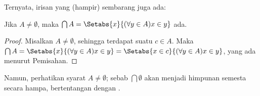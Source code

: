 \documentclass[../../../include/open-logic-section]{subfiles}
\begin{document}
Ternyata, irisan yang (hampir) sembarang juga ada:

\begin{prop}
Jika $A \neq \emptyset$, maka
$\bigcap A = \Setabs{x}{(\forall y \in A)x \in y}$ ada.
\end{prop}

\begin{proof}
Misalkan $A \neq \emptyset$, sehingga terdapat suatu $c \in A$. Maka
$\bigcap A = \Setabs{x}{(\forall y \in A)x \in y} =
\Setabs{x \in c}{(\forall y \in A)x \in y}$, yang ada menurut Pemisahan.
\end{proof}

Namun, perhatikan syarat $A \neq \emptyset$; sebab $\bigcap \emptyset$ akan
menjadi himpunan semesta secara hampa, bertentangan dengan
.
\end{document}
